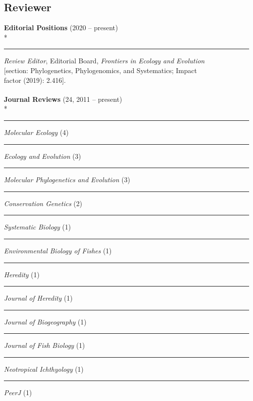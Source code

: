 \documentclass[margin,line]{res}
\begin{document}
\begin{resume}
\section{\sc Reviewer}
\textbf{Editorial Positions} (2020 -- present)\\*
\rule{-1mm}{5mm} \hspace*{4mm} \textit{Review Editor}, Editorial Board, \emph{Frontiers in Ecology and Evolution}\\
\hspace*{4mm} [section: Phylogenetics, Phylogenomics, and Systematics; Impact \\
\hspace*{4mm} factor (2019): 2.416].\\
\\
\textbf{Journal Reviews} (24, 2011 -- present)\\*
\rule{-1mm}{5mm} \hspace*{4mm} \textit{Molecular Ecology} (4) \\
\rule{-1mm}{5mm} \hspace*{4mm} \textit{Ecology and Evolution} (3) \\
\rule{-1mm}{5mm} \hspace*{4mm} \textit{Molecular Phylogenetics and Evolution} (3) \\
\rule{-1mm}{5mm} \hspace*{4mm} \textit{Conservation Genetics} (2) \\
\rule{-1mm}{5mm} \hspace*{4mm} \textit{Systematic Biology} (1) \\
\rule{-1mm}{5mm} \hspace*{4mm} \textit{Environmental Biology of Fishes} (1) \\
\rule{-1mm}{5mm} \hspace*{4mm} \textit{Heredity} (1) \\
\rule{-1mm}{5mm} \hspace*{4mm} \textit{Journal of Heredity} (1) \\
\rule{-1mm}{5mm} \hspace*{4mm} \textit{Journal of Biogeography} (1) \\
\rule{-1mm}{5mm} \hspace*{4mm} \textit{Journal of Fish Biology} (1) \\
\rule{-1mm}{5mm} \hspace*{4mm} \textit{Neotropical Ichthyology} (1) \\
\rule{-1mm}{5mm} \hspace*{4mm} \textit{PeerJ} (1) \\

\end{resume}
\end{document}
